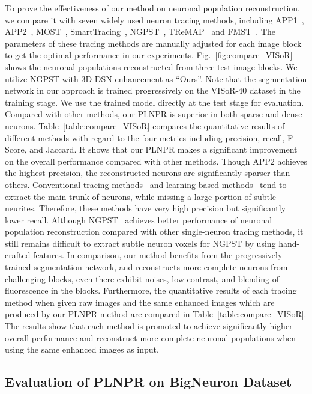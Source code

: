 To prove the effectiveness of our method on neuronal population reconstruction, we compare it with seven widely used neuron tracing methods, including APP1~\cite{Peng2011},  APP2~\cite{Xiao2013}, MOST~\cite{Wu2014}, SmartTracing~\cite{Chen2015}, NGPST~\cite{Quan2015}, TReMAP~\cite{Zhou2016} and  FMST~\cite{Yang2019}.
The parameters of these tracing methods are manually adjusted for each image block to get the optimal performance in our experiments.
%
Fig.~\ref{fig:compare_VISoR} shows the neuronal populations reconstructed from three test image blocks.
We utilize NGPST with 3D DSN enhancement as ``Ours''. Note that the segmentation network in our approach is trained progressively on the VISoR-40 dataset in the training stage. We use the trained model directly at the test stage for evaluation. 
Compared with other methods, our PLNPR is superior in both sparse and dense neurons.
%
Table~\ref{table:compare_VISoR} compares the quantitative results of different methods with regard to the four metrics including precision, recall, F-Score, and Jaccard.
%
It shows that our PLNPR makes a significant improvement on the overall performance compared with other methods.
Though APP2 achieves the highest precision, the reconstructed neurons are significantly sparser than others.
%
Conventional tracing methods~\cite{Peng2011, Xiao2013, Wu2014, Zhou2016} and learning-based methods~\cite{Chen2015, Yang2019} tend to extract the main trunk of neurons, while missing a large portion of subtle neurites. 
Therefore, these methods have very high precision but significantly lower recall.
Although NGPST~\cite{Quan2015} achieves better performance of neuronal population reconstruction compared with other single-neuron tracing methods, it still remains difficult to extract subtle neuron voxels for NGPST by using hand-crafted features.
%
In comparison, our method benefits from the progressively trained segmentation network, and reconstructs more complete neurons from challenging blocks, even there exhibit noises, low contrast, and blending of fluorescence in the blocks.
Furthermore,  the quantitative results of each tracing method when given raw images and the same enhanced images which are produced by our PLNPR method are compared in Table~\ref{table:compare_VISoR}.
The results show that each method is promoted to achieve significantly higher overall performance and reconstruct more complete neuronal populations when using the same enhanced images as input.
%


\subsection{Evaluation of PLNPR on BigNeuron Dataset}
\label{sec:exp_PLNPR_BigNeuron}

